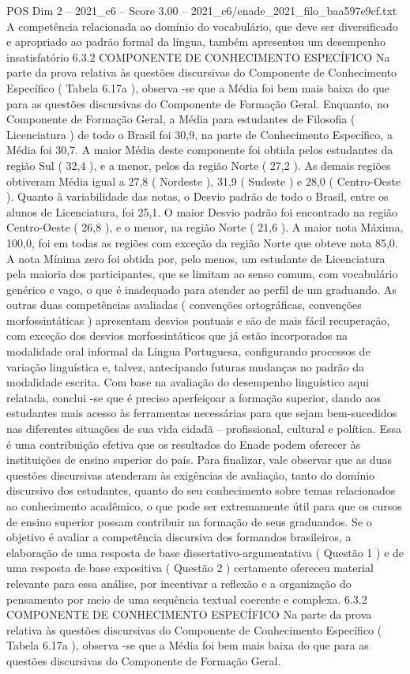 \begin{textsample}{POS Dim 2 – 2021\_c6 – Score 3.00 – 2021\_c6/enade\_2021\_filo\_baa597e9cf.txt}
A competência relacionada ao domínio do vocabulário, que deve ser diversificado e apropriado ao padrão formal da língua, também apresentou um desempenho insatisfatório 6.3.2 COMPONENTE DE CONHECIMENTO ESPECÍFICO Na parte da prova relativa às questões discursivas do Componente de Conhecimento Específico ( Tabela 6.17a ), observa -se que a Média foi bem mais baixa do que para as questões discursivas do Componente de Formação Geral.
Enquanto, no Componente de Formação Geral, a Média para estudantes de Filosofia ( Licenciatura ) de todo o Brasil foi 30,9, na parte de Conhecimento Específico, a Média foi 30,7.
A maior Média deste componente foi obtida pelos estudantes da região Sul ( 32,4 ), e a menor, pelos da região Norte ( 27,2 ).
As demais regiões obtiveram Média igual a 27,8 ( Nordeste ), 31,9 ( Sudeste ) e 28,0 ( Centro-Oeste ).
Quanto à variabilidade das notas, o Desvio padrão de todo o Brasil, entre os alunos de Licenciatura, foi 25,1.
O maior Desvio padrão foi encontrado na região Centro-Oeste ( 26,8 ), e o menor, na região Norte ( 21,6 ).
A maior nota Máxima, 100,0, foi em todas as regiões com exceção da região Norte que obteve nota 85,0.
A nota Mínima zero foi obtida por, pelo menos, um estudante de Licenciatura pela maioria dos participantes, que se limitam ao senso comum, com vocabulário genérico e vago, o que é inadequado para atender ao perfil de um graduando.
As outras duas competências avaliadas ( convenções ortográficas, convenções morfossintáticas ) apresentam desvios pontuais e são de mais fácil recuperação, com exceção dos desvios morfossintáticos que já estão incorporados na modalidade oral informal da Língua Portuguesa, configurando processos de variação linguística e, talvez, antecipando futuras mudanças no padrão da modalidade escrita.
Com base na avaliação do desempenho linguístico aqui relatada, conclui -se que é preciso aperfeiçoar a formação superior, dando aos estudantes mais acesso às ferramentas necessárias para que sejam bem-sucedidos nas diferentes situações de sua vida cidadã – profissional, cultural e política.
Essa é uma contribuição efetiva que os resultados do Enade podem oferecer às instituições de ensino superior do país.
Para finalizar, vale observar que as duas questões discursivas atenderam às exigências de avaliação, tanto do domínio discursivo dos estudantes, quanto do seu conhecimento sobre temas relacionados ao conhecimento acadêmico, o que pode ser extremamente útil para que os cursos de ensino superior possam contribuir na formação de seus graduandos.
Se o objetivo é avaliar a competência discursiva dos formandos brasileiros, a elaboração de uma resposta de base dissertativo-argumentativa ( Questão 1 ) e de uma resposta de base expositiva ( Questão 2 ) certamente ofereceu material relevante para essa análise, por incentivar a reflexão e a organização do pensamento por meio de uma sequência textual coerente e complexa. 6.3.2 COMPONENTE DE CONHECIMENTO ESPECÍFICO Na parte da prova relativa às questões discursivas do Componente de Conhecimento Específico ( Tabela 6.17a ), observa -se que a Média foi bem mais baixa do que para as questões discursivas do Componente de Formação Geral.

\end{textsample}

